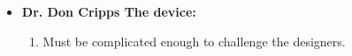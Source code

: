 \begin{itemize}
	\item  {\textbf{Dr. Don Cripps   The device:}}
	\begin{enumerate}
		\item Must be complicated enough to challenge the designers.\\[.5cm] 
		
		
		
%
%		
%		
%		       

		  
%		
%
%		
		       
		


%
	

\end{enumerate}
\end{itemize}
